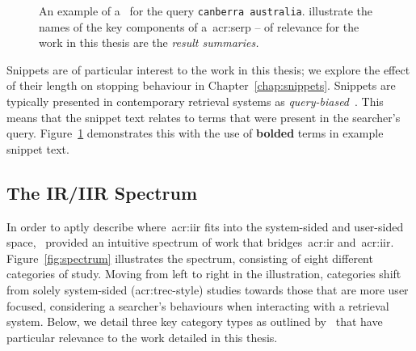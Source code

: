 \begin{figure}[t!]
    \centering
    \caption[Example of a~\gls{acr:serp}]{An example of a~ for the query \texttt{canberra australia}.  illustrate the names of the key components of a~\gls{acr:serp} – of relevance for the work in this thesis are the \emph{result summaries.}}
    \label{fig:serp_example}
\end{figure}

Snippets are of particular interest to the work in this thesis; we explore the effect of their length on stopping behaviour in Chapter~\ref{chap:snippets}. Snippets are typically presented in contemporary retrieval systems as \emph{query-biased}~\citep{tombros1998query_biased}. This means that the snippet text relates to terms that were present in the searcher's query. Figure~\ref{fig:serp_example} demonstrates this with the use of \textbf{bolded} terms in example snippet text.

\subsection{The IR/IIR Spectrum}\label{sec:ir_background:user:spectrum}
In order to aptly describe where~\gls{acr:iir} fits into the system-sided and user-sided space,~\cite{kelly2009iir} provided an intuitive spectrum of work that bridges~\gls{acr:ir} and~\gls{acr:iir}. Figure~\ref{fig:spectrum} illustrates the spectrum, consisting of eight different categories of study. Moving from left to right in the illustration, categories shift from solely system-sided (\gls{acr:trec}-style) studies towards those that are more user focused, considering a searcher's behaviours when interacting with a retrieval system. Below, we detail three key category types as outlined by~\cite{kelly2009iir} that have particular relevance to the work detailed in this thesis.

